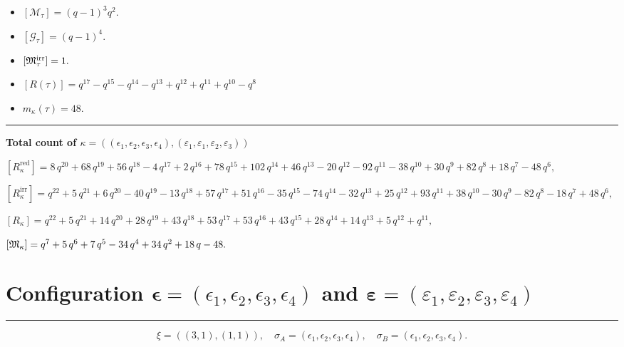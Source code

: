 \documentclass[10pt,a4paper]{amsart}
\begin{document}
\begin{itemize}
 \item $[\mathcal{M}_{\tau}] = {\left(q - 1\right)}^{3} q^{2} .$

 \item $[\mathcal{G}_{\tau}] = {\left(q - 1\right)}^{4} .$

 \item $[{\frak M}_{\tau}^{\textrm{irr}}] = 1 .$

 \item $[R(\tau)] = q^{17} - q^{15} - q^{14} - q^{13} + q^{12} + q^{11} + q^{10} - q^{8} $

 \item $m_{\kappa}(\tau) = 48 .$

 \end{itemize}
\noindent\rule{9cm}{2pt}\vspace{0.2cm}

\noindent\textbf{Total count of $\kappa = ((\epsilon_1,\epsilon_2,\epsilon_3,\epsilon_4), (\varepsilon_1,\varepsilon_1,\varepsilon_2,\varepsilon_3))$}\medskip

${[R_{\kappa}^{\textrm{red}}]} = 8 \, q^{20} + 68 \, q^{19} + 56 \, q^{18} - 4 \, q^{17} + 2 \, q^{16} + 78 \, q^{15} + 102 \, q^{14} + 46 \, q^{13} - 20 \, q^{12} - 92 \, q^{11} - 38 \, q^{10} + 30 \, q^{9} + 82 \, q^{8} + 18 \, q^{7} - 48 \, q^{6} ,$

${[R_{\kappa}^{\textrm{irr}}]} = q^{22} + 5 \, q^{21} + 6 \, q^{20} - 40 \, q^{19} - 13 \, q^{18} + 57 \, q^{17} + 51 \, q^{16} - 35 \, q^{15} - 74 \, q^{14} - 32 \, q^{13} + 25 \, q^{12} + 93 \, q^{11} + 38 \, q^{10} - 30 \, q^{9} - 82 \, q^{8} - 18 \, q^{7} + 48 \, q^{6} ,$

${[R_{\kappa}]} = q^{22} + 5 \, q^{21} + 14 \, q^{20} + 28 \, q^{19} + 43 \, q^{18} + 53 \, q^{17} + 53 \, q^{16} + 43 \, q^{15} + 28 \, q^{14} + 14 \, q^{13} + 5 \, q^{12} + q^{11} ,$

${[{\frak M}_{\kappa}]} = q^{7} + 5 \, q^{6} + 7 \, q^{5} - 34 \, q^{4} + 34 \, q^{2} + 18 \, q - 48 .$

\newpage{}

\section{Configuration $\bm{\epsilon} = (\epsilon_1,\epsilon_2,\epsilon_3,\epsilon_4)$ and $\bm{\varepsilon} =(\varepsilon_1,\varepsilon_2,\varepsilon_3,\varepsilon_4)$}
\noindent\rule{8cm}{0.4pt}

$$\xi = ({(3, 1), (1, 1)}),\quad \sigma_A = ({{\epsilon_1, \epsilon_2, \epsilon_3}, {\epsilon_4}}),\quad \sigma_B = ({{\epsilon_1, \epsilon_2, \epsilon_3}, {\epsilon_4}}).$$
\end{document}
